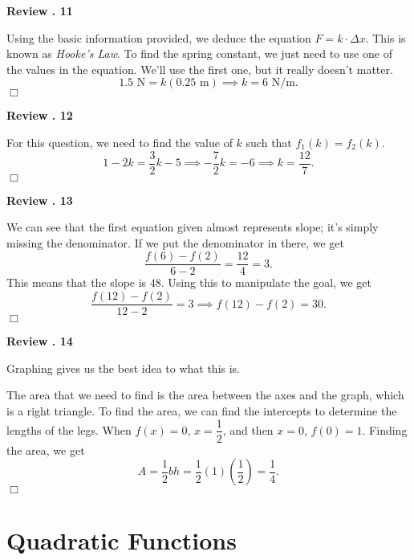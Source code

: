 \documentclass[lang=en,11pt]{elegantbook}
\begin{document}
\noindent \textbf{Review . 11}

Using the basic information provided, we deduce the equation $F=k\cdot \Delta x$.  This is known as \textit{Hooke's Law}.  To find the spring constant, we just need to use one of the values in the equation.  We'll use the first one, but it really doesn't matter.  $$1.5\text{ N}=k(0.25\text{ m}) \implies \boxed{k=6 \text{ N}/\text{m}}.$$ $\Box$\vspace{3mm}

\noindent \textbf{Review . 12}

For this question, we need to find the value of $k$ such that $f_1(k)=f_2(k).$  $$1-2k=\dfrac{3}{2}k-5 \implies -\dfrac{7}{2}k=-6 \implies \boxed{k=\dfrac{12}{7}}.$$ $\Box$\vspace{3mm}

\noindent \textbf{Review . 13}

We can see that the first equation given almost represents slope; it's simply missing the denominator.  If we put the denominator in there, we get $$\dfrac{f(6)-f(2)}{6-2}=\dfrac{12}{4}=3.$$  This means that the slope is $48$.  Using this to manipulate the goal, we get $$\dfrac{f(12)-f(2)}{12-2}=3 \implies f(12)-f(2)=\boxed{30}.$$ $\Box$\vspace{3mm}

\noindent \textbf{Review . 14}

Graphing gives us the best idea to what this is.  

\begin{figure}[!h]
    \centering
\end{figure}

The area that we need to find is the area between the axes and the graph, which is a right triangle.  To find the area, we can find the intercepts to determine the lengths of the legs.  When $f(x)=0$, $x=\dfrac{1}{2}$, and then $x=0$, $f(0)=1$.  Finding the area, we get $$A=\dfrac{1}{2}bh=\dfrac{1}{2}\left(1\right)\left(\dfrac{1}{2}\right)=\boxed{\dfrac{1}{4}}.$$ $\Box$\vspace{3mm}
\chapter{Quadratic Functions}
\end{document}
